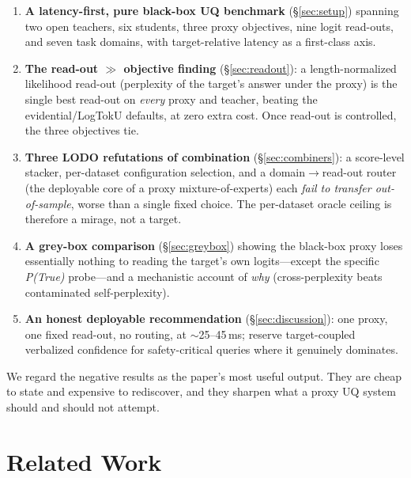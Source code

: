 \documentclass[11pt]{article}
\begin{document}
\begin{enumerate}[leftmargin=1.4em,itemsep=1pt,topsep=2pt]
\item \textbf{A latency-first, pure black-box UQ benchmark} (\S\ref{sec:setup})
spanning two open teachers, six students, three proxy objectives, nine logit
read-outs, and seven task domains, with target-relative latency as a first-class axis.
\item \textbf{The read-out $\gg$ objective finding} (\S\ref{sec:readout}): a
length-normalized likelihood read-out (perplexity of the target's answer under the
proxy) is the single best read-out on \emph{every} proxy and teacher, beating the
evidential/LogTokU defaults, at zero extra cost. Once read-out is controlled, the
three objectives tie.
\item \textbf{Three LODO refutations of combination} (\S\ref{sec:combiners}): a
score-level stacker, per-dataset configuration selection, and a
domain$\rightarrow$read-out router (the deployable core of a proxy mixture-of-experts)
each \emph{fail to transfer out-of-sample}, worse than a single fixed choice. The
per-dataset oracle ceiling is therefore a mirage, not a target.
\item \textbf{A grey-box comparison} (\S\ref{sec:greybox}) showing the black-box proxy
loses essentially nothing to reading the target's own logits---except the specific
\emph{P(True)} probe---and a mechanistic account of \emph{why} (cross-perplexity beats
contaminated self-perplexity).
\item \textbf{An honest deployable recommendation} (\S\ref{sec:discussion}): one proxy,
one fixed read-out, no routing, at $\sim$25--45\,ms; reserve target-coupled verbalized
confidence for safety-critical queries where it genuinely dominates.
\end{enumerate}

We regard the negative results as the paper's most useful output. They are cheap to
state and expensive to rediscover, and they sharpen what a proxy UQ system should and
should not attempt.

\section{Related Work}
\end{document}

